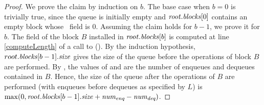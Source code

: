 \sizeCorrectRes*
\begin{proof}
We prove the claim by induction on $b$. 
The base case when ${b=0}$ is trivially true, since the queue is initially empty and 
$\mbox{\textnormal{\textit{root}}}.\mbox{\textit{blocks}}[0]$ contains an empty block whose \size\ field is $0$. 
Assuming the claim holds for $b-1$, we prove it for $b$.
The  field of the block $B$ installed in $\mbox{\textnormal{\textit{root}}}.\mbox{\textit{blocks}}[b]$ is computed
at line \ref{computeLength} of a call to ().
By the induction hypothesis, $root.\mbox{\textit{blocks}}[b-1].\mbox{\textit{size}}$ gives the size of the queue before the operations
of block $B$ are performed.
By , the values of  and 
are the number of enqueues and dequeues contained in $B$.
Hence, the size of the queue after the operations of $B$ are performed (with enqueues before dequeues as specified by $L$)
is $\max(0, \mbox{\textnormal{\textit{root}}}.\mbox{\textit{blocks}}[b-1].\mbox{\textit{size}} + \mbox{\textnormal{\textit{num\textsubscript{enq}}}} - \mbox{\textnormal{\textit{num\textsubscript{deq}}}})$.
\end{proof}

